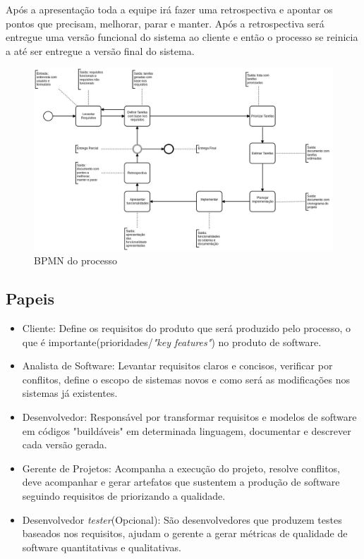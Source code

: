 \documentclass[	DIV=calc,%
							paper=a4,%
							fontsize=12pt,%
							onecolumn]{scrartcl}	 					%
\begin{document}
Após a apresentação toda a equipe irá fazer uma retrospectiva e apontar os pontos que precisam, melhorar, parar e manter. Após a retrospectiva será entregue uma versão funcional do sistema ao cliente e então o processo se reinicia a até ser entregue a versão final do sistema.


\begin{figure}
	\centering
	\includegraphics[width=\textwidth]{bpmn.png}
	\caption{BPMN do processo}
	\label{bpmn}
\end{figure}


\subsection{Papeis}
\begin{itemize}
	\item Cliente: Define os requisitos do produto que será produzido pelo processo, o que é importante(prioridades/\textit{"key features"}) no produto de software.
	\item Analista de Software: Levantar requisitos claros e concisos, verificar por conflitos, define o  escopo de sistemas novos e como será as modificações nos sistemas já existentes.
	\item Desenvolvedor: Responsável por transformar requisitos e modelos de software em códigos "buildáveis" em determinada linguagem, documentar e descrever cada versão gerada.
	\item Gerente de Projetos: Acompanha a execução do projeto, resolve conflitos, deve acompanhar e gerar artefatos que sustentem a produção de software seguindo requisitos de priorizando a qualidade.
	\item Desenvolvedor \textit{tester}(Opcional): São desenvolvedores que produzem testes baseados nos requisitos, ajudam o gerente a gerar métricas de qualidade de software quantitativas e qualitativas.   
\end{itemize}
\end{document}
